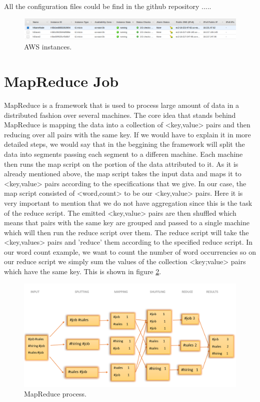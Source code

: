 \documentclass{article}
\newcommand*\setcaptioncitation[1]{\def\captioncitation{\textit{Source:}~#1}}
\let\captioncitation\relax
\begin{document}
        All the configuration files could be find in the github repository .....
        \begin{figure}[H]
            \centering 
            \includegraphics[width=1\linewidth]{./img/instances.png}
            \setcaptioncitation{Screenshot idk.}
            \caption{AWS instances.}
            \label{fig:instances}
        \end{figure}

        \section{MapReduce Job}

MapReduce is a framework that is used to process large amount of data in a distributed fashion over several machines. The core idea that stands behind MapReduce is mapping the data into a collection of <key,value> pairs and then reducing over all pairs with the same key. If we would have to explain it in more detailed steps, we would say that in the beggining the framework will split the data into segments passing each segment to a differen machine. Each machine then runs the map script on the portion of the data attributed to it. As it is already mentioned above, the map script takes the input data and maps it to <key,value> pairs according to the specifications that we give. In our case, the map script consisted of <word,count> to be our <key,value> pairs. Here it is very important to mention that we do not have aggregation since this is the task of the reduce script. The emitted <key,value> pairs are then shuffled which means that pairs with the same key are grouped and passed to a single machine which will then run the reduce script over them. The reduce script will take the <key,values> pairs and 'reduce' them according to the specified reduce script. In our word count example, we want to count the number of word occurrencies so on our reduce script we simply sum the values of the collection <key;value> pairs which have the same key. This is shown in figure \ref{fig:MapReduce}. 

\begin{figure}[H]
            \centering 
            \includegraphics[width=1\linewidth]{./img/MapReduce.png}
            \setcaptioncitation{self-made}
            \caption{MapReduce process.}
            \label{fig:MapReduce}
        \end{figure}
\end{document}
